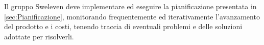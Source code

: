 Il gruppo Sweleven deve implementare ed eseguire la pianificazione presentata in \ref{sec:Pianificazione}, monitorando frequentemente ed iterativamente l'avanzamento del prodotto e i costi, tenendo traccia di eventuali problemi e delle soluzioni adottate per risolverli. 